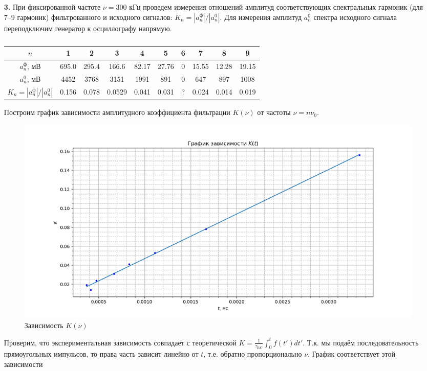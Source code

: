 \documentclass[a4paper,12pt]{article}
\begin{document}
\begin{enumerate}
\item [\textbf{3.}]
При фиксированной частоте $\nu = 300$ кГц проведем измерения отношений амплитуд соответствующих спектральных гармоник (для 7–9 гармоник) фильтрованного и исходного сигналов: $K_n = |a_n^\text{ф}|/|a_n^0|$. Для измерения
амплитуд $a_n^0$ спектра исходного сигнала переподключим генератор к осциллографу напрямую.

\begin{table}[h!]
    \centering
    \begin{tabular}{|c|c|c|c|c|c|c|c|c|c|}
\hline
$n$ & 1 & 2 & 3 & 4 & 5 & 6 & 7 & 8 & 9 \\ \hline
$a_n^\text{ф}$, мВ & 695.0 & 295.4 & 166.6 & 82.17 & 27.76 & 0 & 15.55 & 12.28 & 19.15 \\ \hline
$a_n^0$, мВ & 4452 & 3768 & 3151 & 1991 & 891 & 0 & 647 & 897 & 1008 \\ \hline
$K_n = |a_n^\text{ф}|/|a_n^0|$ & 0.156 & 0.078 & 0.0529 & 0.041 & 0.031 & ? & 0.024 &0.014 & 0.019 \\ \hline
\end{tabular}
    \caption{}
    \label{table4}
\end{table}

Построим график зависимости амплитудного коэффициента фильтрации $K(\nu)$ от частоты $\nu = n\nu_0$.
\begin{figure}[h]
    \centering
    \includegraphics[width=\textwidth]{K(nu).png}
    \caption{Зависимость $K(\nu)$}
    \label{grafic3}
\end{figure}





Проверим, что экспериментальная зависимость
совпадает с теоретической $K = \frac{1}{\tau_\text{RC}} \int_0^t f(t')dt'$. Т.к. мы подаём последовательность прямоугольных импульсов, то права часть зависит линейно от $t$, т.е. обратно пропорционально $\nu$. График соответствует этой зависимости









\end{enumerate}
\end{document}
